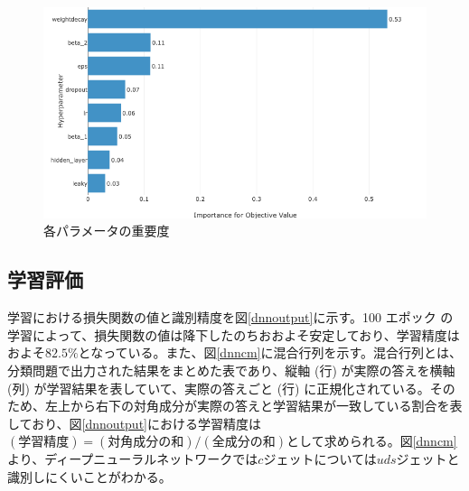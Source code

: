 \begin{figure}[H]
	\begin{center}
 \includegraphics[keepaspectratio, scale=0.3]
 	{Figure/Flavortagging/bays3.png}
 		\caption{各パラメータの重要度}
 		\label{dnnbayes3}
	\end{center}
\end{figure}


\subsection{学習評価}
学習における損失関数の値と識別精度を図\ref{dnnoutput}に示す。100 エポック の学習によって、損失関数の値は降下したのちおおよそ安定しており、学習精度はおよそ$82.5\%$となっている。また、図\ref{dnncm}に混合行列を示す。混合行列とは、分類問題で出力された結果をまとめた表であり、縦軸 (行) が実際の答えを横軸 (列) が学習結果を表していて、実際の答えごと (行) に正規化されている。そのため、左上から右下の対角成分が実際の答えと学習結果が一致している割合を表しており、図\ref{dnnoutput}における学習精度は$(学習精度) = (対角成分の和) / (全成分の和)$として求められる。図\ref{dnncm}より、ディープニューラルネットワークでは$c$ジェットについては$uds$ジェットと識別しにくいことがわかる。

